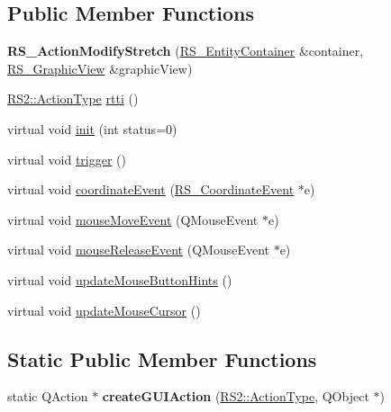 \subsection*{Public Member Functions}
\begin{DoxyCompactItemize}
\item 
\hypertarget{classRS__ActionModifyStretch_ae1ae10a968f0807305518759efac6f7b}{{\bfseries R\-S\-\_\-\-Action\-Modify\-Stretch} (\hyperlink{classRS__EntityContainer}{R\-S\-\_\-\-Entity\-Container} \&container, \hyperlink{classRS__GraphicView}{R\-S\-\_\-\-Graphic\-View} \&graphic\-View)}\label{classRS__ActionModifyStretch_ae1ae10a968f0807305518759efac6f7b}

\item 
\hyperlink{classRS2_afe3523e0bc41fd637b892321cfc4b9d7}{R\-S2\-::\-Action\-Type} \hyperlink{classRS__ActionModifyStretch_a42ad534adc2909c338736dc2e32884e7}{rtti} ()
\item 
virtual void \hyperlink{classRS__ActionModifyStretch_a3d3f351bc998eb2bee6ce967ed8ecfe5}{init} (int status=0)
\item 
virtual void \hyperlink{classRS__ActionModifyStretch_ae94ef515cb45bb9531c7f8d283a9ff79}{trigger} ()
\item 
virtual void \hyperlink{classRS__ActionModifyStretch_a2c7a9640e2002afff274334ee225fdae}{coordinate\-Event} (\hyperlink{classRS__CoordinateEvent}{R\-S\-\_\-\-Coordinate\-Event} $\ast$e)
\item 
virtual void \hyperlink{classRS__ActionModifyStretch_aedc3502727afafdf74e2010d779feafd}{mouse\-Move\-Event} (Q\-Mouse\-Event $\ast$e)
\item 
virtual void \hyperlink{classRS__ActionModifyStretch_a35606ab922a518abbf451e1487808ce1}{mouse\-Release\-Event} (Q\-Mouse\-Event $\ast$e)
\item 
virtual void \hyperlink{classRS__ActionModifyStretch_a7991c68318d2ff44e7284b7c8539cda4}{update\-Mouse\-Button\-Hints} ()
\item 
virtual void \hyperlink{classRS__ActionModifyStretch_abe0f0112128dff43c3533eb868d49894}{update\-Mouse\-Cursor} ()
\end{DoxyCompactItemize}
\subsection*{Static Public Member Functions}
\begin{DoxyCompactItemize}
\item 
\hypertarget{classRS__ActionModifyStretch_aaf665311f386f2b80b7828cedc6c27c0}{static Q\-Action $\ast$ {\bfseries create\-G\-U\-I\-Action} (\hyperlink{classRS2_afe3523e0bc41fd637b892321cfc4b9d7}{R\-S2\-::\-Action\-Type}, Q\-Object $\ast$)}\label{classRS__ActionModifyStretch_aaf665311f386f2b80b7828cedc6c27c0}

\end{DoxyCompactItemize}
